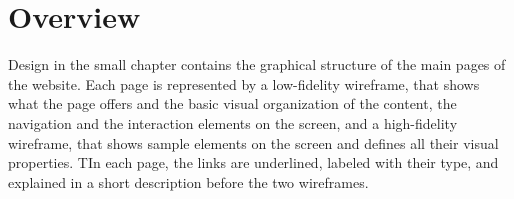 \documentclass[../../DD.tex]{subfiles}
\begin{document}
\section{Overview}
	Design in the small chapter contains the graphical structure of the main pages of the website. Each page is represented by a low-fidelity wireframe, that shows what the page offers and the basic visual organization of the content, the navigation and the interaction elements on the screen, and a high-fidelity wireframe, that shows sample elements on the screen and defines all their visual properties. TIn each page, the links are underlined, labeled with their type, and explained in a short description before the two wireframes.
\end{document}
